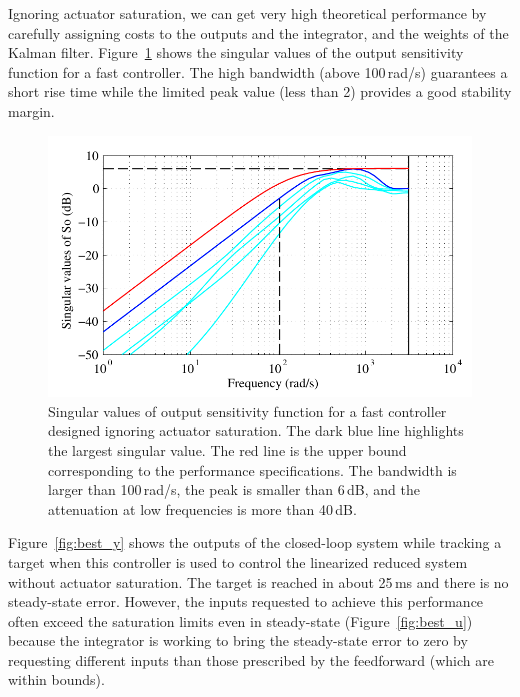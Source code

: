 \documentclass[12pt,lot, lof]{puthesis}
\begin{document}
Ignoring actuator saturation, we can get very high theoretical performance by carefully assigning costs to the outputs and the integrator, and the weights of the Kalman filter. Figure~\ref{fig:best_So} shows the singular values of the output sensitivity function for a fast controller.
The high bandwidth (above 100\,rad/s) guarantees a short rise time while the limited peak value (less than 2) provides a good stability margin.

\begin{figure}[htbp]
	\centering
	\includegraphics{chap10/best_So}
	\caption{Singular values of output sensitivity function for a fast controller designed ignoring actuator saturation.
		The dark blue line highlights the largest singular value.
		The red line is the upper bound corresponding to the performance specifications.
		The bandwidth is larger than 100\,rad/s, the peak is smaller than 6\,dB, and the attenuation at low frequencies is more than 40\,dB.
	}
	\label{fig:best_So}
\end{figure}

Figure~\ref{fig:best_y} shows the outputs of the closed-loop system while tracking a target when this controller is used to control the linearized reduced system without actuator saturation. The target is reached in about 25\,ms and there is no steady-state error.
However, the inputs requested to achieve this performance often exceed the saturation limits even in steady-state (Figure~\ref{fig:best_u}) because the integrator is working to bring the steady-state error to zero by requesting different inputs than those prescribed by the feedforward (which are within bounds).
\end{document}
